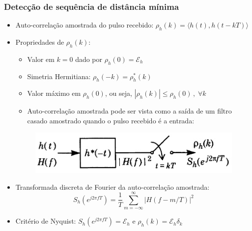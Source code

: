 \begin{frame}
	\frametitle{Detecção de sequência de distância mínima}

	\begin{itemize}
	    \item Auto-correlação amostrada do pulso recebido: $\rho_h(k) = \langle h(t), h(t-kT) \rangle$
	    \item Propriedades de $\rho_h(k)$:
	    \begin{itemize}
		\item Valor em $k=0$ dado por $\rho_h(0) = \mathcal{E}_h$
		\item Simetria Hermitiana: $\rho_h(-k) = \rho_h^*(k)$
		\item Valor máximo em $\rho_h(0)$, ou seja, $|\rho_h(k)| \leq \rho_h(0) \, , \; \forall k$
		\item Auto-correlação amostrada pode ser vista como a saída de um filtro casado amostrado quando o pulso recebido é a entrada:
	    \end{itemize}
	    \begin{figure}[t]	
		\begin{center}
		\includegraphics[width=0.4\columnwidth]{figs/pam_33}
		\end{center} 
	    \end{figure}
	    \item Transformada discreta de Fourier da auto-correlação amostrada:
	    \begin{equation*}
		S_h(e^{j2\pi fT}) = \frac{1}{T} \sum_{m=-\infty}^{\infty} | H(f-m/T) |^2
	    \end{equation*}
	    \item Critério de Nyquist: $S_h(e^{j2\pi fT}) = \mathcal{E}_h$ e $\rho_h(k) = \mathcal{E}_h \delta_k$
	\end{itemize}
\end{frame}

